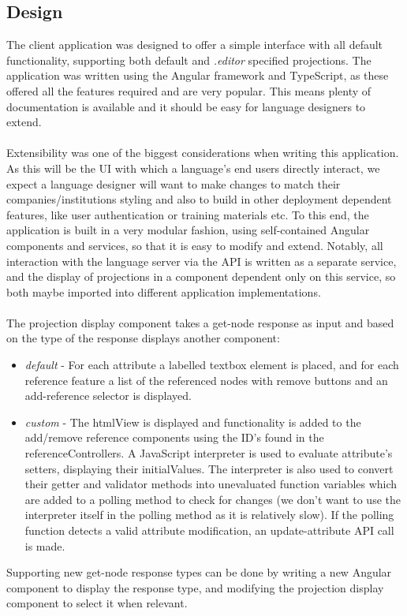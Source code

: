 \documentclass{article}
\begin{document}
{\subsection{Design}
The client application was designed to offer a simple interface with all default functionality, supporting both default and \emph{.editor} specified projections. The application was written using the Angular framework and TypeScript, as these offered all the features required and are very popular. This means plenty of documentation is available and it should be easy for language designers to extend.
\\
\\
Extensibility was one of the biggest considerations when writing this application. As this will be the UI with which a language's end users directly interact, we expect a language designer will want to make changes to match their companies/institutions styling and also to build in other deployment dependent features, like user authentication or training materials etc. To this end, the application is built in a very modular fashion, using self-contained Angular components and services, so that it is easy to modify and extend. Notably, all interaction with the language server via the API is written as a separate service, and the display of projections in a component dependent only on this service, so both maybe imported into different application implementations. 
\\
\\
The projection display component takes a get-node response as input and based on the type of the response displays another component:
\begin{itemize}
\item \emph{default} - For each attribute a labelled textbox element is placed, and for each reference feature a list of the referenced nodes with remove buttons and an add-reference selector is displayed.
\item \emph{custom} - The htmlView is displayed and functionality is added to the add/remove reference components using the ID's found in the referenceControllers. A JavaScript interpreter is used to evaluate attribute's setters, displaying their initialValues. The interpreter is also used to convert their getter and validator methods into unevaluated function variables which are added to a polling method to check for changes (we don't want to use the interpreter itself in the polling method as it is relatively slow). If the polling function detects a valid attribute modification, an update-attribute API call is made.
\end{itemize}
Supporting new get-node response types can be done by writing a new Angular component to display the response type, and modifying the projection display component to select it when relevant.
}
\end{document}
